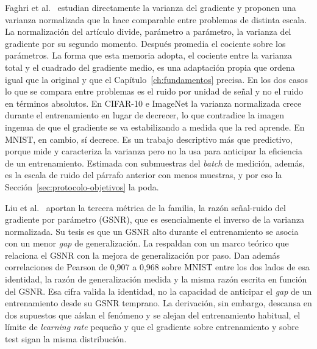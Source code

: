 Faghri et al.~\cite{faghri2020study} estudian directamente la varianza del gradiente y proponen una varianza normalizada que la hace comparable entre problemas de distinta escala. La normalización del artículo divide, parámetro a parámetro, la varianza del gradiente por su segundo momento. Después promedia el cociente sobre los parámetros. La forma que esta memoria adopta, el cociente entre la varianza total y el cuadrado del gradiente medio, es una adaptación propia que ordena igual que la original y que el Capítulo~\ref{ch:fundamentos} precisa. En los dos casos lo que se compara entre problemas es el ruido por unidad de señal y no el ruido en términos absolutos. En CIFAR-10 e ImageNet la varianza normalizada crece durante el entrenamiento en lugar de decrecer, lo que contradice la imagen ingenua de que el gradiente se va estabilizando a medida que la red aprende. En MNIST, en cambio, sí decrece. Es un trabajo descriptivo más que predictivo, porque mide y caracteriza la varianza pero no la usa para anticipar la eficiencia de un entrenamiento. Estimada con submuestras del \emph{batch} de medición, además, es la escala de ruido del párrafo anterior con menos muestras, y por eso la Sección~\ref{sec:protocolo-objetivos} la poda.

Liu et al.~\cite{liu2020understanding} aportan la tercera métrica de la familia, la razón señal-ruido del gradiente por parámetro (GSNR), que es esencialmente el inverso de la varianza normalizada. Su tesis es que un GSNR alto durante el entrenamiento se asocia con un menor \emph{gap} de generalización. La respaldan con un marco teórico que relaciona el GSNR con la mejora de generalización por paso. Dan además correlaciones de Pearson de 0,907 a 0,968 sobre MNIST entre los dos lados de esa identidad, la razón de generalización medida y la misma razón escrita en función del GSNR. Esa cifra valida la identidad, no la capacidad de anticipar el \emph{gap} de un entrenamiento desde su GSNR temprano. La derivación, sin embargo, descansa en dos supuestos que aíslan el fenómeno y se alejan del entrenamiento habitual, el límite de \emph{learning rate} pequeño y que el gradiente sobre entrenamiento y sobre test sigan la misma distribución.

